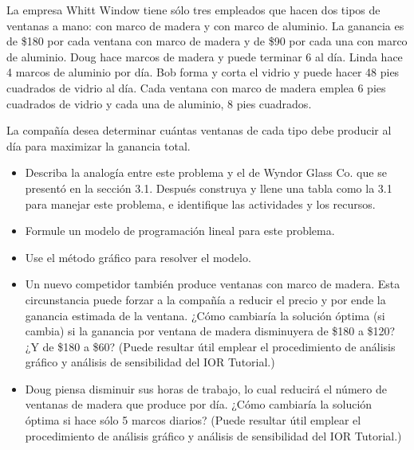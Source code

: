 \begin{Ejer} La empresa Whitt Window tiene s\'olo tres empleados que hacen dos tipos de ventanas a mano: con marco de madera y con marco de aluminio. La ganancia es de \$180 por cada ventana con marco de madera y de \$90 por cada una con marco de aluminio. Doug hace marcos de madera y puede terminar 6 al d\'ia. Linda hace 4 marcos de aluminio por d\'ia. Bob forma y corta el vidrio y puede hacer 48 pies cuadrados de vidrio al d\'ia. Cada ventana con marco de madera emplea 6 pies cuadrados de vidrio y cada una de aluminio, 8 pies cuadrados.

La compa\~n\'ia desea determinar cu\'antas ventanas de cada tipo debe producir al d\'ia para maximizar la ganancia total.

\begin{itemize}
\item[a)] Describa la analog\'ia entre este problema y el de Wyndor Glass Co. que se present\'o en la secci\'on 3.1. Despu\'es construya y llene una tabla como la 3.1 para manejar este problema, e identifique las actividades y los recursos.
\item[b)] Formule un modelo de programaci\'on lineal para este problema.
\item[c)] Use el m\'etodo gr\'afico para resolver el modelo.
\item[d)] Un nuevo competidor tambi\'en produce ventanas con marco de madera. Esta circunstancia puede forzar a la compa\~n\'ia a reducir el precio y por ende la ganancia estimada de la ventana. ¿C\'omo cambiar\'ia la soluci\'on \'optima (si cambia) si la ganancia por ventana de madera disminuyera de \$180 a \$120? ¿Y de \$180 a \$60? (Puede resultar \'util emplear el procedimiento de an\'alisis gr\'afico y an\'alisis de sensibilidad del IOR Tutorial.)
\item[e)] Doug piensa disminuir sus horas de trabajo, lo cual reducir\'a el n\'umero de ventanas de madera que produce por d\'ia. ¿C\'omo cambiar\'ia la soluci\'on \'optima si hace s\'olo 5 marcos diarios? (Puede resultar \'util emplear el procedimiento de an\'alisis gr\'afico y an\'alisis de sensibilidad del IOR Tutorial.)
\end{itemize}


\end{Ejer}


